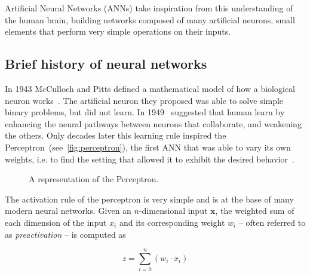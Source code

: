 Artificial Neural Networks (ANNs) take inspiration from this understanding of
the human brain, building networks composed of many artificial neurons, small
elements that perform very simple operations on their inputs.

\subsection{Brief history of neural networks}
In 1943 McCulloch and Pitts defined a mathematical model of how a biological
neuron works~\citep{McCulloch43}. The artificial neuron they proposed was
able to solve simple binary problems, but did not learn. In 1949~\cite{Hebb49}
suggested that human learn by enhancing the neural pathways between neurons
that collaborate, and weakening the others. Only decades later this learning
rule inspired the Perceptron~(see~\autoref{fig:perceptron}), the first ANN that
was able to vary its own weights, i.e. to find the setting that allowed it to
exhibit the desired behavior~\citep{Rosenblatt57}.

\begin{figure}[h]
    \centering
    \begin{neuralnetwork} [nodespacing=6mm, layerspacing=23mm,
            maintitleheight=2.5em, layertitleheight=5em,
            height=3, toprow=true, nodesize=17pt,
            style={}, title={}, titlestyle={}]

        \outputlayer[count=1, text=\nodetextsigma]
        {\setdefaultlinklabel{\wilink}\linklayers}
        \redefinelayerspacing{18mm}
        \outputlayer[count=1, text=\nodetextstep]
        \linklayers
        \redefinelayerspacing{16mm}
        \outputlayer[count=1, text=\nodetexty]
        \linklayers
    \end{neuralnetwork}
    \centering
    \caption{\label{fig:perceptron}A representation of the Perceptron.}
\end{figure}

\noindent The activation rule of the perceptron is very simple and is at the
base of many modern neural networks. Given an $n$-dimensional input
$\mathbf{x}$, the weighted sum of each dimension of the input $x_i$ and its
corresponding weight $w_i$ -- often referred to as \emph{preactivation} -- is
computed as

\begin{equation*}
    z = \sum_{i=0}^{n}(w_i \cdot x_i)
\end{equation*}

